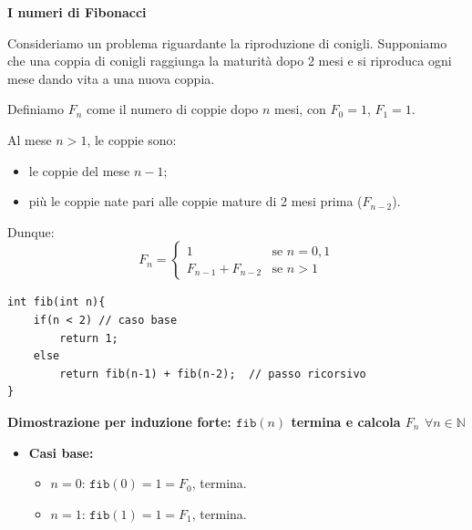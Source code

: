 \begin{esempio}
\textbf{I numeri di Fibonacci}

Consideriamo un problema riguardante la riproduzione di conigli. Supponiamo che una coppia di conigli raggiunga la maturità dopo 2 mesi e si riproduca ogni mese dando vita a una nuova coppia.

Definiamo $F_n$ come il numero di coppie dopo $n$ mesi, con $F_0=1$, $F_1=1$. 

Al mese $n>1$, le coppie sono:
\begin{itemize}
    \item le coppie del mese $n-1$;
    \item più le coppie nate pari alle coppie mature di 2 mesi prima ($F_{n-2}$).
\end{itemize}

Dunque:
\[
F_n = 
\begin{cases}
    1 & \text{se } n = 0,1 \\
    F_{n-1} + F_{n-2} & \text{se } n > 1
\end{cases}
\]

\begin{tcolorbox}[
    colback=backcolour, 
    colframe=framegray, 
    boxrule=0.5pt, 
    sharp corners,
    left=5mm, right=5mm, 
    top=5mm, bottom=5mm,
    width=\linewidth
]
\begin{lstlisting}[commentstyle=\color{codegray}]
int fib(int n){
    if(n < 2) // caso base
        return 1;
    else 
        return fib(n-1) + fib(n-2);  // passo ricorsivo
}
\end{lstlisting}
\end{tcolorbox}


\textbf{Dimostrazione per induzione forte: $\texttt{fib}(n)$ termina e calcola $F_n$ $\forall n \in \mathbb{N}$}

\begin{itemize}
    \item \textbf{Casi base:} 
    \begin{itemize}
        \item $n=0$: $\texttt{fib}(0)=1=F_0$, termina.
        \item $n=1$: $\texttt{fib}(1)=1=F_1$, termina.
    \end{itemize}
    

\end{itemize}
\end{esempio}
